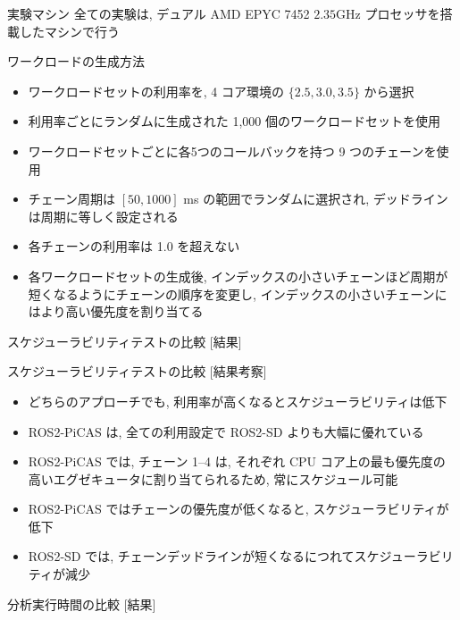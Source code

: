 \begin{frame}{実験マシン}
    全ての実験は, デュアル AMD EPYC 7452 $2.35 \mathrm{GHz}$ プロセッサを搭載したマシンで行う
\end{frame}

\begin{frame}{ワークロードの生成方法}
    \begin{itemize}
        \item ワークロードセットの利用率を, 4 コア環境の $\{2.5,3.0,3.5\}$ から選択
        \item 利用率ごとにランダムに生成された 1,000 個のワークロードセットを使用
        \item ワークロードセットごとに各5つのコールバックを持つ 9 つのチェーンを使用
        \item チェーン周期は $[50,1000]$ ms の範囲でランダムに選択され, デッドラインは周期に等しく設定される
        \item 各チェーンの利用率は 1.0 を超えない
        \item 各ワークロードセットの生成後, インデックスの小さいチェーンほど周期が短くなるようにチェーンの順序を変更し, インデックスの小さいチェーンにはより高い優先度を割り当てる
    \end{itemize}
\end{frame}

\begin{frame}{スケジューラビリティテストの比較 [結果]}
\end{frame}

\begin{frame}{スケジューラビリティテストの比較 [結果考察]}
    \begin{itemize}
        \item どちらのアプローチでも, 利用率が高くなるとスケジューラビリティは低下
        \item ROS2-PiCAS は, 全ての利用設定で ROS2-SD よりも大幅に優れている
        \item ROS2-PiCAS では, チェーン 1--4 は, それぞれ CPU コア上の最も優先度の高いエグゼキュータに割り当てられるため, 常にスケジュール可能
        \item ROS2-PiCAS ではチェーンの優先度が低くなると, スケジューラビリティが低下
        \item ROS2-SD では, チェーンデッドラインが短くなるにつれてスケジューラビリティが減少
    \end{itemize}
\end{frame}

\begin{frame}{分析実行時間の比較 [結果]}
\end{frame}

